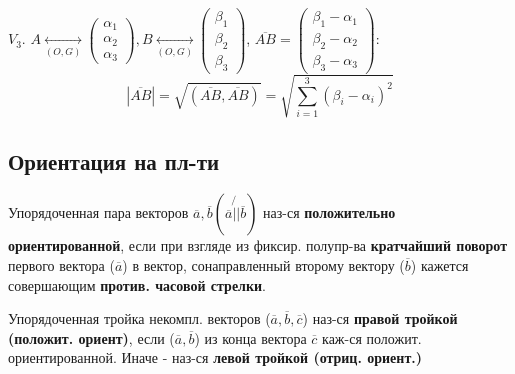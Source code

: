 \begin{consequence}
$V_3$. $A\underset{(O, G)}{\longleftrightarrow} \begin{pmatrix}\alpha_1 \\ \alpha_2 \\ \alpha_3 \end{pmatrix}, B \underset{(O, G)}{\longleftrightarrow} \begin{pmatrix}\beta_1 \\ \beta_2 \\ \beta_3 \end{pmatrix}$, $\overline{AB} = \begin{pmatrix}\beta_1 - \alpha_1 \\ \beta_2 - \alpha_2 \\ \beta_3 - \alpha_3 \end{pmatrix}$:
\[
|\overline{AB}| = \sqrt{(\overline{AB}, \overline{AB})} = \sqrt{\sum_{i = 1}^{3} (\beta_i - \alpha_i)^{2}}
\] 
\end{consequence}

\subsection{Ориентация на пл-ти}

\begin{definition}
Упорядоченная пара векторов $\overline{a}, \overline{b} (\overline{a} \not{||} \overline{b})$ наз-ся \textbf{положительно ориентированной}, если при взгляде из фиксир. полупр-ва \textbf{кратчайший поворот} первого вектора ($\overline{a}$) в вектор, сонаправленный второму вектору ($\overline{b}$) кажется совершающим \textbf{против. часовой стрелки}.
\end{definition}

\begin{definition}
Упорядоченная тройка некомпл. векторов ($\overline{a}, \overline{b}, \overline{c}$) наз-ся \textbf{правой тройкой (положит. ориент)}, если ($\overline{a}, \overline{b}$) из конца вектора $\overline{c}$ каж-ся положит. ориентированной.
Иначе - наз-ся \textbf{левой тройкой (отриц. ориент.)}
\end{definition}

